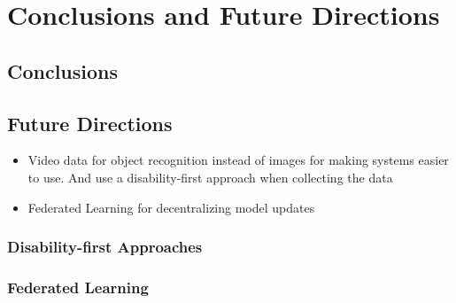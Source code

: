 
\chapter{Conclusions and Future Directions}

\section{Conclusions}


\section{Future Directions}

\begin{itemize}
	\item Video data for object recognition instead of images for making systems easier to use. And use a disability-first approach when collecting the data
	\item Federated Learning for decentralizing model updates 
\end{itemize}


\subsection{Disability-first Approaches}


\subsection{Federated Learning}